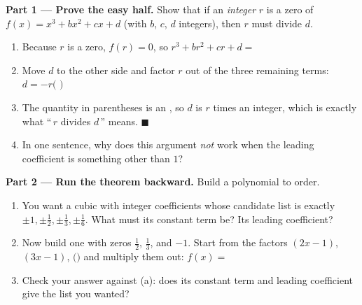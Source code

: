 \documentclass[10pt]{article}
\begin{document}
\begin{tcolorbox}[colback=white, colframe=black!40, title=\textbf{Tier E --- Extension},
    fonttitle=\bfseries, arc=1.5mm, left=3mm, right=3mm, top=2mm, bottom=2mm, breakable]
\textbf{Part 1 --- Prove the easy half.} Show that if an \emph{integer} $r$ is a zero of
$f(x) = x^3 + bx^2 + cx + d$ (with $b$, $c$, $d$ integers), then $r$ must divide $d$.
\begin{enumerate}[label=(\alph*), leftmargin=1.8em, itemsep=6pt]
  \item Because $r$ is a zero, $f(r) = 0$, so \; $r^3 + br^2 + cr + d = $ \blank{1.0cm}
  \item Move $d$ to the other side and factor $r$ out of the three remaining terms:
        $d = -r\big($ \blank{3.4cm} $\big)$
  \item The quantity in parentheses is an \blank{2.0cm}, so $d$ is $r$ times an integer, which is
        exactly what ``\,$r$ divides $d$\,'' means. \; $\blacksquare$
  \item In one sentence, why does this argument \emph{not} work when the leading coefficient is
        something other than $1$? \writeline
\end{enumerate}

\vspace{5pt}
\textbf{Part 2 --- Run the theorem backward.} Build a polynomial to order.
\begin{enumerate}[label=(\alph*), leftmargin=1.8em, itemsep=6pt]
  \item You want a cubic with integer coefficients whose candidate list is exactly
        $\pm 1, \pm\tfrac12, \pm\tfrac13, \pm\tfrac16$. What must its constant term be?
        \blank{1.4cm} \; Its leading coefficient? \blank{1.4cm}
  \item Now build one with zeros $\tfrac12$, $\tfrac13$, and $-1$. Start from the factors
        $(2x-1)$, $(3x-1)$, $($\blank{1.4cm}$)$ and multiply them out:
        $f(x) = $ \blank{5.0cm}
  \item Check your answer against (a): does its constant term and leading coefficient give the list
        you wanted? \blank{1.2cm}
\end{enumerate}


\end{tcolorbox}
\end{document}
